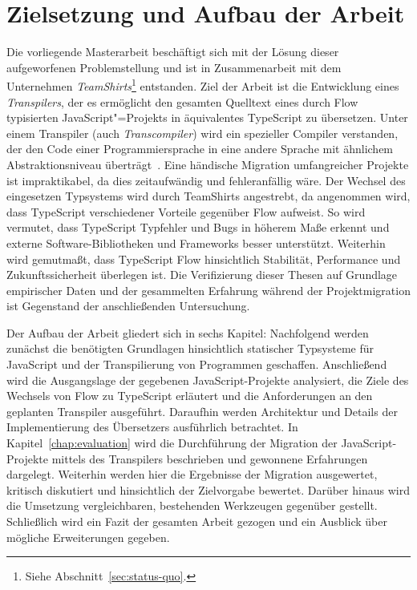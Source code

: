 \section{Zielsetzung und Aufbau der Arbeit}

Die vorliegende Masterarbeit beschäftigt sich mit der Lösung dieser aufgeworfenen Problemstellung und ist in Zusammenarbeit mit dem Unternehmen \textit{TeamShirts}\footnote{Siehe Abschnitt~\ref{sec:status-quo}.} entstanden. Ziel der Arbeit ist die Entwicklung eines \emph{Transpilers}, der es ermöglicht den gesamten Quelltext eines durch Flow typisierten JavaScript"=Projekts in äquivalentes TypeScript zu übersetzen. Unter einem Transpiler (auch \emph{Transcompiler}) wird ein spezieller Compiler verstanden, der den Code einer Programmiersprache in eine andere Sprache mit ähnlichem Abstraktionsniveau überträgt~\autocite{EVGENIY:2016}.
Eine händische Migration umfangreicher Projekte ist impraktikabel, da dies zeitaufwändig und fehleranfällig wäre. Der Wechsel des eingesetzen Typsystems wird durch TeamShirts angestrebt, da angenommen wird, dass TypeScript verschiedener Vorteile gegenüber Flow aufweist. So wird vermutet, dass TypeScript Typfehler und Bugs in höherem Maße erkennt und externe Software-Bibliotheken und Frameworks besser unterstützt. Weiterhin wird gemutmaßt, dass TypeScript Flow hinsichtlich Stabilität, Performance und Zukunftssicherheit überlegen ist. Die Verifizierung dieser Thesen auf Grundlage empirischer Daten und der gesammelten Erfahrung während der Projektmigration ist Gegenstand der anschließenden Untersuchung.

Der Aufbau der Arbeit gliedert sich in sechs Kapitel: Nachfolgend werden zunächst die benötigten Grundlagen hinsichtlich statischer Typsysteme für JavaScript und der Transpilierung von Programmen geschaffen. Anschließend wird die Ausgangslage der gegebenen JavaScript-Projekte analysiert, die Ziele des Wechsels von Flow zu TypeScript erläutert und die Anforderungen an den geplanten Transpiler ausgeführt. Daraufhin werden Architektur und Details der Implementierung des Übersetzers ausführlich betrachtet. In Kapitel~\ref{chap:evaluation} wird die Durchführung der Migration der JavaScript-Projekte mittels des Transpilers beschrieben und gewonnene Erfahrungen dargelegt. Weiterhin werden hier die Ergebnisse der Migration ausgewertet, kritisch diskutiert und hinsichtlich der Zielvorgabe bewertet. Darüber hinaus wird die Umsetzung vergleichbaren, bestehenden Werkzeugen gegenüber gestellt. Schließlich wird ein Fazit der gesamten Arbeit gezogen und ein Ausblick über mögliche Erweiterungen gegeben.
